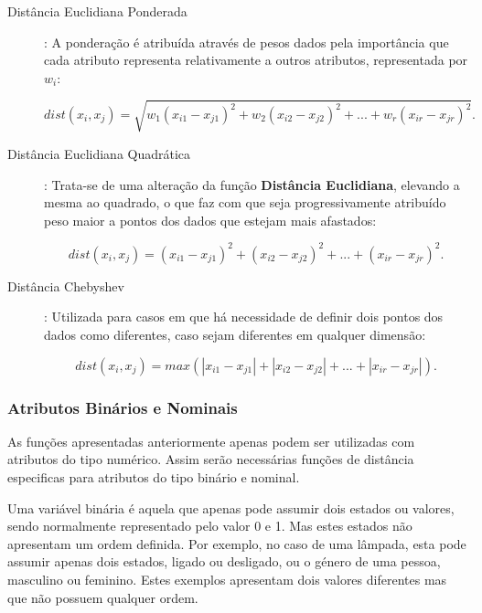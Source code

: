 \begin{description}
\item[Distância Euclidiana Ponderada]: A ponderação é atribuída através de pesos dados pela importância que cada atributo representa relativamente a outros atributos, representada por $w_{i}$:

\begin{equation}
dist(x_{i}, x_{j}) = \sqrt{w_{1}(x_{i1} - x_{j1})^2 + w_{2}(x_{i2} - x_{j2})^2 +...+ w_{r}(x_{ir} - x_{jr})^2}.
\end{equation} 

\item[Distância Euclidiana Quadrática]: Trata-se de uma alteração da função \textbf{Distância Euclidiana}, elevando a mesma ao quadrado, o que faz com que seja progressivamente atribuído peso maior a pontos dos dados que estejam mais afastados:

\begin{equation}
dist(x_{i}, x_{j}) = (x_{i1} - x_{j1})^2 + (x_{i2} - x_{j2})^2 +...+ (x_{ir} - x_{jr})^2.
\end{equation}

\item[Distância Chebyshev]: Utilizada para casos em que há necessidade de definir dois pontos dos dados como diferentes, caso sejam diferentes em qualquer dimensão:

\begin{equation}
dist(x_{i}, x_{j}) = max(|x_{i1} - x_{j1}| + |x_{i2} - x_{j2}| +...+ |x_{ir} - x_{jr}|).
\label{eq:cheby}
\end{equation}

\end{description}

\subsubsection{Atributos Binários e Nominais}

As funções apresentadas anteriormente apenas podem ser utilizadas com atributos do tipo numérico. Assim serão necessárias funções de distância especificas para atributos do tipo binário e nominal.

Uma variável binária é aquela que apenas pode assumir dois estados ou valores, sendo normalmente representado pelo valor 0 e 1. Mas estes estados não apresentam um ordem definida. Por exemplo, no caso de uma lâmpada, esta pode assumir apenas dois estados, ligado ou desligado, ou o género de uma pessoa, masculino ou feminino. Estes exemplos apresentam dois valores diferentes mas que não possuem qualquer ordem. 

